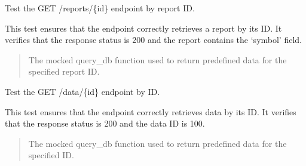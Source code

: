 \documentclass[letterpaper,10pt,english]{sphinxmanual}
\begin{document}

\begin{fulllineitems}
\label{\detokenize{test.my_fastapi:test.my_fastapi.test_main.test_get_company_report_by_id}}
\pysigstartsignatures
\pysiglinewithargsret
{}
{}
{}
\pysigstopsignatures
\sphinxAtStartPar
Test the GET /reports/\{id\} endpoint by report ID.

\sphinxAtStartPar
This test ensures that the endpoint correctly retrieves a report by its ID.
It verifies that the response status is 200 and the report contains the ‘symbol’ field.
\begin{quote}\begin{description}
\sphinxAtStartPar
{} \textendash{} The mocked query\_db function used to return predefined data for the specified report ID.

\end{description}\end{quote}

\end{fulllineitems}


\begin{fulllineitems}
\label{\detokenize{test.my_fastapi:test.my_fastapi.test_main.test_get_data_by_id}}
\pysigstartsignatures
\pysiglinewithargsret
{}
{}
{}
\pysigstopsignatures
\sphinxAtStartPar
Test the GET /data/\{id\} endpoint by ID.

\sphinxAtStartPar
This test ensures that the endpoint correctly retrieves data by its ID.
It verifies that the response status is 200 and the data ID is 100.
\begin{quote}\begin{description}
\sphinxAtStartPar
{} \textendash{} The mocked query\_db function used to return predefined data for the specified ID.

\end{description}\end{quote}

\end{fulllineitems}
\end{document}
